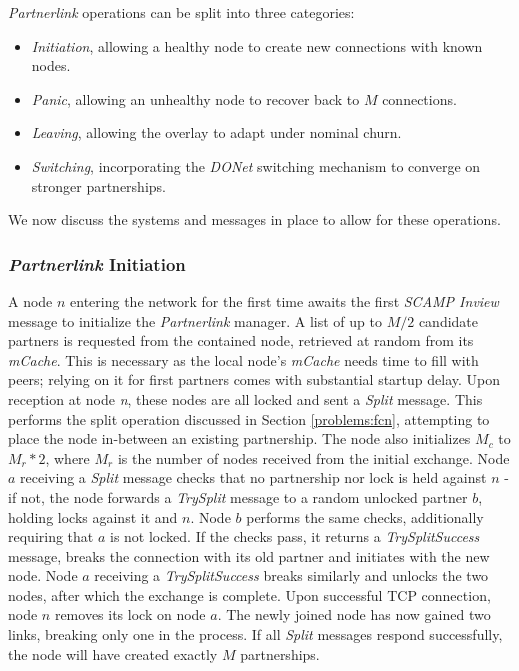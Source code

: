 \documentclass[12pt,a4paper]{article}
\begin{document}
\textit{Partnerlink} operations can be split into three categories:
\begin{itemize}
	\item \textit{Initiation}, allowing a healthy node to create new connections with known nodes.
	\item \textit{Panic}, allowing an unhealthy node to recover back to \(M\) connections.
	\item \textit{Leaving}, allowing the overlay to adapt under nominal churn.
	\item \textit{Switching}, incorporating the \textit{DONet} switching mechanism to converge on stronger partnerships.
\end{itemize}
We now discuss the systems and messages in place to allow for these operations.

\subsubsection{\textit{Partnerlink} Initiation} \label{css:partnerlink:initiation}
A node \(n\) entering the network for the first time awaits the first \textit{SCAMP Inview} message to initialize the \textit{Partnerlink} manager. A list of up to \(M / 2\) candidate partners is requested from the contained node, retrieved at random from its \textit{mCache}. This is necessary as the local node's \textit{mCache} needs time to fill with peers; relying on it for first partners comes with substantial startup delay.
Upon reception at node \textit{n}, these nodes are all locked and sent a \textit{Split} message. This performs the split operation discussed in Section \ref{problems:fcn}, attempting to place the node in-between an existing partnership. The node also initializes \(M_c\) to \(M_r * 2\), where \(M_r\) is the number of nodes received from the initial exchange. Node \(a\) receiving a \textit{Split} message checks that no partnership nor lock is held against \(n\) - if not, the node forwards a \textit{TrySplit} message to a random unlocked partner \(b\), holding locks against it and \(n\). Node \(b\) performs the same checks, additionally requiring that \(a\) is not locked. If the checks pass, it returns a \textit{TrySplitSuccess} message, breaks the connection with its old partner and initiates with the new node. Node \(a\) receiving a \textit{TrySplitSuccess} breaks similarly and unlocks the two nodes, after which the exchange is complete. Upon successful TCP connection, node \(n\) removes its lock on node \(a\). The newly joined node has now gained two links, breaking only one in the process. If all \textit{Split} messages respond successfully, the node will have created exactly \(M\) partnerships.
\end{document}
